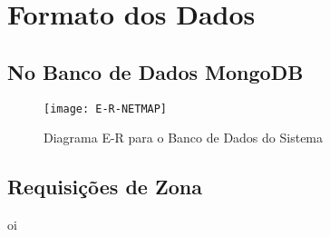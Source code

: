 \chapter{Formato dos Dados}\label{chp:fd}







\section{No Banco de Dados MongoDB}



\begin{figure}[!h]
	\centering
	\caption{Diagrama E-R para o Banco de Dados do Sistema}
  \texttt{[image: E-R-NETMAP]}
\label{fig:e-r}  

\end{figure}





\section{Requisições de Zona}

oi
